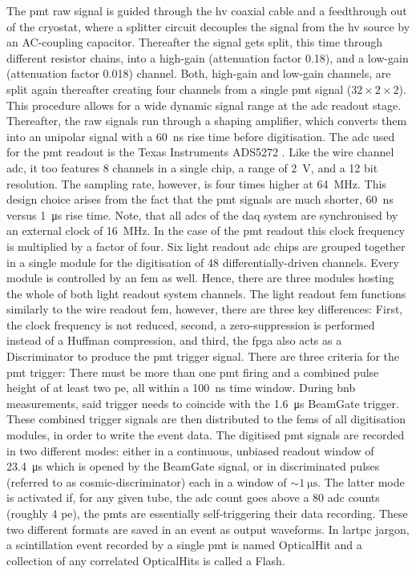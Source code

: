 The \gls{pmt} raw signal is guided through the \gls{hv} coaxial cable and a feedthrough out of the cryostat, where a splitter circuit decouples the signal from the \gls{hv} source by an AC-coupling capacitor. Thereafter the signal gets split, this time through different resistor chains, into a high-gain (attenuation factor \num{0.18}), and a low-gain (attenuation factor \num{0.018}) channel. Both, high-gain and low-gain channels, are split again thereafter creating four channels from a single \gls{pmt} signal ($\num{32} \times \num{2} \times \num{2}$). This procedure allows for a wide dynamic signal range at the \gls{adc} readout stage. Thereafter, the raw signals run through a shaping amplifier, which converts them into an unipolar signal with a \SI{60}{\nano\second} rise time before digitisation. The \gls{adc} used for the \gls{pmt} readout is the Texas Instruments ADS5272 \cite{ADCPMTDataSheet}. Like the wire channel \gls{adc}, it too features \num{8} channels in a single chip, a range of \SI{2}{\volt}, and a \num{12} bit resolution. The sampling rate, however, is four times higher at \SI{64}{\mega\hertz}. This design choice arises from the fact that the \gls{pmt} signals are much shorter, \ie \SI{60}{\nano\second} versus \SI{1}{\micro\second} rise time. Note, that all \glspl{adc} of the \gls{daq} system are synchronised by an external clock of \SI{16}{\mega\hertz}. In the case of the \gls{pmt} readout this clock frequency is multiplied by a factor of four. Six light readout \gls{adc} chips are grouped together in a single module for the digitisation of \num{48} differentially-driven channels. Every module is controlled by an \gls{fem} as well. Hence, there are three modules hosting the whole of both light readout system channels. The light readout \gls{fem} functions similarly to the wire readout \gls{fem}, however, there are three key differences: First, the clock frequency is not reduced, second, a zero-suppression is performed instead of a Huffman compression, and third, the \gls{fpga} also acts as a \gls{Discriminator} to produce the \gls{pmt} trigger signal. There are three criteria for the \gls{pmt} trigger: There must be more than one \gls{pmt} firing and a combined pulse height of at least two \gls{pe}, all within a \SI{100}{\nano\second} time window. During \gls{bnb} measurements, said trigger needs to coincide with the \SI{1.6}{\micro\second} \gls{BeamGate} trigger. These combined trigger signals are then distributed to the \glspl{fem} of all digitisation modules, in order to write the event data. The digitised \gls{pmt} signals are recorded in two different modes: either in a continuous, unbiased readout window of \SI{23.4}{\micro\second} which is opened by the \gls{BeamGate} signal, or in discriminated pulses (referred to as cosmic-discriminator) each in a window of $\sim \SI{1}{\micro\second}$. The latter mode is activated if, for any given tube, the \gls{adc} count goes above a \num{80} \gls{adc} counts (roughly \num{4} \gls{pe}), \ie the \glspl{pmt} are essentially self-triggering their data recording. These two different formats are saved in an event as output waveforms. In \gls{lartpc} jargon, a scintillation event recorded by a single \gls{pmt} is named \gls{OpticalHit} and a collection of any correlated \glspl{OpticalHit} is called a \gls{Flash}.


